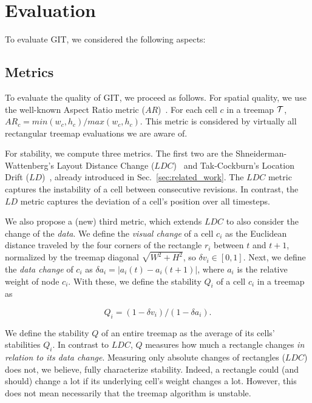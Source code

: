 \section{Evaluation}
\label{sec:evaluation}
%
To evaluate GIT, we considered the following aspects:

\subsection{Metrics}
\label{sec:eval_metrics}
%
To evaluate the quality of GIT, we proceed as follows. For spatial quality, we use the well-known Aspect Ratio metric ($AR$)~\cite{sqr}. For each cell $c$ in a treemap ${\cal T}$, $AR_c = min(w_c, h_c)/max(w_c, h_c)$. This metric is considered by virtually all rectangular treemap evaluations we are aware of.

For stability, we compute three metrics. The first two are the Shneiderman-Wattenberg's Layout Distance Change ($LDC$)~\cite{ordered} and Tak-Cockburn's Location Drift ($LD$)~\cite{hilbert_moore}, already introduced in
Sec.~\ref{sec:related_work}. The $LDC$ metric captures the instability of a cell between consecutive revisions. In contrast, the $LD$ metric captures the deviation of a cell's position over all timesteps.

We also propose a (new) third metric, which extends $LDC$ to also consider the change of the \emph{data}. We define the \emph{visual change} of a cell $c_i$ as the Euclidean distance traveled by the four corners of the rectangle $r_i$ between $t$ and $t+1$, normalized by the treemap diagonal $\sqrt{W^2+H^2}$, so $\delta v_i \in [0,1]$. Next, we define the \emph{data change} of $c_i$ as $\delta a_i = |a_i(t)-a_i(t+1)|$, where $a_i$ is the relative weight of node $c_i$. With these, we define the stability $Q_i$ of a cell $c_i$ in a treemap as

\begin{equation}
Q_i =  (1-\delta v_i) / (1 - \delta a_i).
\label{eqn:stab_ratio}
\end{equation}

We define the stability $Q$ of an entire treemap as the average of its cells' stabilities $Q_i$. In contrast to $LDC$, $Q$ measures how much a rectangle changes \emph{in relation to its data change}. Measuring only absolute changes of rectangles ($LDC$) does not, we believe, fully characterize stability. Indeed, a rectangle could (and should) change a lot if its underlying cell's weight changes a lot. However, this does not mean necessarily that the treemap algorithm is unstable.

